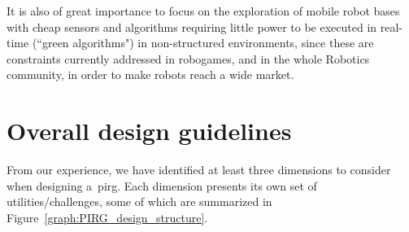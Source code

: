 It is also of great importance to focus on the exploration of mobile robot bases with cheap sensors and algorithms requiring little power to be executed in real-time (``green algorithms") in non-structured environments, since these are constraints currently addressed in robogames, and in the whole Robotics community, in order to make robots reach a wide market. 

\section{Overall design guidelines}\label{sec:dimensions}
From our experience, we have identified at least three dimensions to consider when designing a~\gls{pirg}. Each dimension presents its own set of utilities/challenges, some of which are summarized in Figure~\ref{graph:PIRG_design_structure}. 


